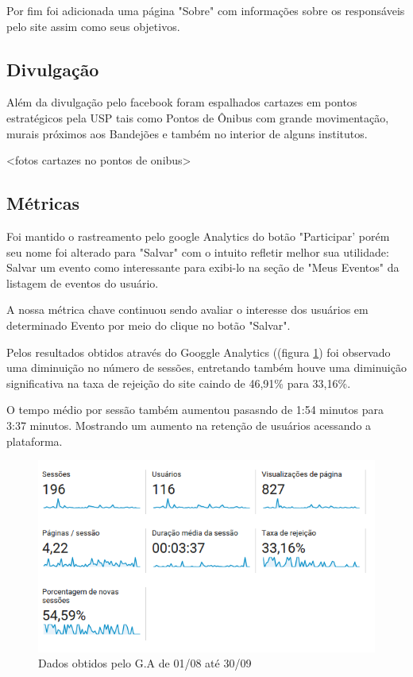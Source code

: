 \par Por fim foi adicionada uma página "Sobre" com informações sobre os responsáveis pelo site assim como seus objetivos.
\subsection{Divulgação}
\par Além da divulgação pelo facebook foram espalhados cartazes em pontos estratégicos pela USP tais como Pontos de Ônibus com grande movimentação, murais próximos aos Bandejões e também no interior de alguns institutos.

<fotos cartazes no pontos de onibus>

\subsection{Métricas}

\par Foi mantido o rastreamento pelo google Analytics do botão "Participar' porém seu nome foi alterado para "Salvar" com o intuito refletir melhor sua utilidade: Salvar um evento como interessante para exibi-lo na seção de "Meus Eventos" da listagem de eventos do usuário.

\par A nossa métrica chave continuou sendo avaliar o interesse dos usuários em determinado Evento por meio do clique no botão "Salvar".

\par Pelos resultados obtidos através do Googgle Analytics ((figura \ref{fig:analytics_2ainteracao_dados}) foi observado uma diminuição no número de sessões, entretando também houve uma diminuição significativa na taxa de rejeição do site caindo de 46,91\% para 33,16\%. 
\par O tempo médio por sessão também aumentou pasasndo de 1:54 minutos para 3:37 minutos. Mostrando um aumento na retenção de usuários acessando a plataforma.
\begin{figure}[htb]
\includegraphics[width=15cm]{figuras/analytics_2ainteracao_dados}
\caption{\label{fig:analytics_2ainteracao_dados} Dados obtidos pelo G.A de 01/08 até 30/09}
\end{figure}

